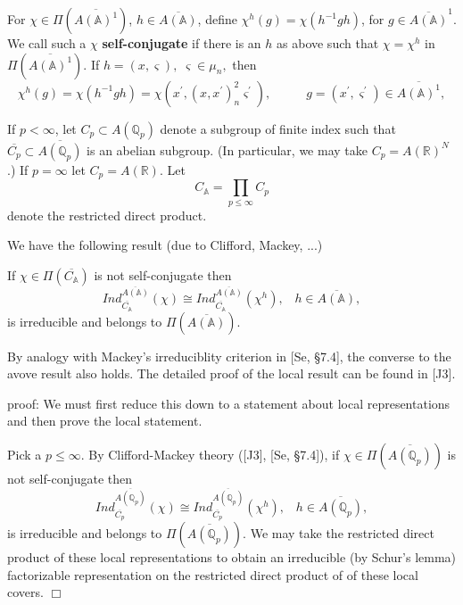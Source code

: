 For $\chi \in \Pi (\overline{A({\mathbb{A}})^1})$,
$h\in \overline{A({\mathbb{A}})}$, define
$\chi ^h(g)=\chi (h^{-1}gh)$, for $g\in 
\overline{A({\mathbb{A}})}^1$. We call such a
$\chi $ \textbf{self-conjugate} if
there is an $h$ as above such that $\chi =\chi ^h$
in $\Pi (\overline{A({\mathbb{A}})^1})$.
If $h=(x,\varsigma ),\;\varsigma \in \mu _n,$ then 
\[
\chi ^h(g)=\chi (h^{-1}gh)
=\chi (x^{\prime },(x,x^{\prime })_n^2\varsigma^{\prime }),
\;\;\;\;\;\;\;\;\;\;g=(x^{\prime },
\varsigma ^{\prime })\in \overline{A({\mathbb{A}})^1},
\]

If $p<\infty$, let $C_p\subset A({\mathbb{Q}}_p)$ denote a subgroup
of finite index such that
$\overline{C_p}\subset \overline{A({\mathbb{Q}}_p)}$ is
an abelian subgroup. (In particular, we may take
$C_p=A({\mathbb{R}})^N$.) If $p=\infty$ let $C_p=A({\mathbb{R}})$. Let
\begin{equation}
C_{{\mathbb{A}}}=\prod_{p\leq \infty }C_p
\end{equation}
denote the restricted direct product.

We have the following result (due to Clifford, Mackey,
...)

\begin{lemma}
If $\chi \in \Pi (\overline{C_{{\mathbb{A}}}})$ is not self-conjugate then 
\[
Ind_{\overline{C_{{\mathbb{A}}}}}^{\overline{A({\mathbb{A}})}}(\chi )
\cong Ind_{\overline{C_{{\mathbb{A}}}}}^{\overline{A({\mathbb{A}})}}(\chi ^h),
\;\;\;h\in  \overline{A({\mathbb{A}})},
\]
is irreducible and belongs to $\Pi (\overline{A({\mathbb{A}})})$.
\end{lemma}

\begin{remark} By analogy with Mackey's irreduciblity
criterion in [Se, \S 7.4], the converse to the avove result also
holds. The detailed proof of the local result can be found in
[J3].
\end{remark}

\textsf{proof}: We must first reduce this down to a statement about local
representations and then prove the local statement.

Pick a $p\leq \infty $. By Clifford-Mackey theory ([J3], [Se, \S 7.4]),
if $\chi \in \Pi (\overline{A({\mathbb{Q}}_p)})$ is not self-conjugate then 
\begin{equation}
Ind_{\overline{C_p}}^{\overline{A({\mathbb{Q}}_p)}}(\chi )
\cong Ind_{\overline{C_p}}^{\overline{A({\mathbb{Q}}_p)}}(\chi ^h),
\;\;\;h\in \overline{A({\mathbb{Q}}_p)},
\end{equation}
is irreducible and belongs to $\Pi (\overline{A({\mathbb{Q}}_p)})$. We may take
the restricted direct product of these local representations to obtain an
irreducible (by Schur's lemma) factorizable representation on
the restricted direct product of of these local covers. $\Box $


